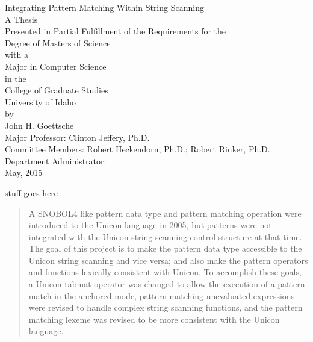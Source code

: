 \documentclass{article}
\begin{document}
\begin{titlepage}
\begin{center}
	\begin{large}
	Integrating Pattern Matching Within String Scanning\\
	\vspace{3 pc}
	A Thesis\\
	Presented in Partial Fulfillment of the Requirements for the\\
	Degree of Masters of Science\\
	with a\\
	Major in Computer Science\\
	in the\\
	College of Graduate Studies\\
	University of Idaho\\
	by\\John H. Goettsche\\
	\vspace{3 pc}
	Major Professor: Clinton Jeffery, Ph.D.\\
	Committee Members: Robert Heckendorn, Ph.D.; Robert Rinker, 	Ph.D.\\
	Department Administrator: \\
	\vspace{7 pc}
	May, 2015
	\end{large}
	\end{center}
\end{titlepage}

	
\thispagestyle{empty}
\pagebreak
\thispagestyle{fancy}
stuff goes here
\pagebreak

\begin{abstract}
A SNOBOL4 like pattern data type and pattern matching operation were introduced to the Unicon language in 2005, but patterns were not integrated with the Unicon string scanning control structure at that time.  The goal of this project is to make the pattern data type accessible to the Unicon string scanning and vice versa; and also make the pattern operators and functions lexically consistent with Unicon.  To accomplish these goals, a Unicon tabmat operator was changed to allow the execution of a pattern match in the anchored mode, pattern matching unevaluated expressions were revised to handle complex string scanning functions, and the pattern matching lexeme was revised to be more consistent with the Unicon language.
\end{abstract}
\pagebreak
\end{document}
